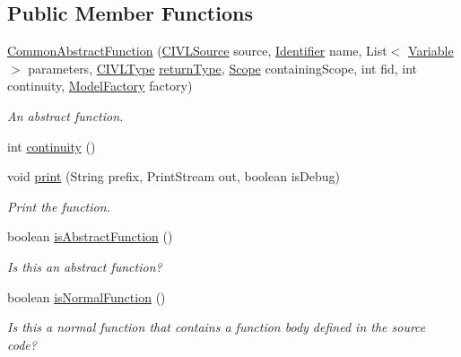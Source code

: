 \subsection*{Public Member Functions}
\begin{DoxyCompactItemize}
\item 
\hyperlink{classedu_1_1udel_1_1cis_1_1vsl_1_1civl_1_1model_1_1common_1_1CommonAbstractFunction_a3bab5782bce73b29c6c4b5688684b956}{Common\+Abstract\+Function} (\hyperlink{interfaceedu_1_1udel_1_1cis_1_1vsl_1_1civl_1_1model_1_1IF_1_1CIVLSource}{C\+I\+V\+L\+Source} source, \hyperlink{interfaceedu_1_1udel_1_1cis_1_1vsl_1_1civl_1_1model_1_1IF_1_1Identifier}{Identifier} name, List$<$ \hyperlink{interfaceedu_1_1udel_1_1cis_1_1vsl_1_1civl_1_1model_1_1IF_1_1variable_1_1Variable}{Variable} $>$ parameters, \hyperlink{interfaceedu_1_1udel_1_1cis_1_1vsl_1_1civl_1_1model_1_1IF_1_1type_1_1CIVLType}{C\+I\+V\+L\+Type} \hyperlink{classedu_1_1udel_1_1cis_1_1vsl_1_1civl_1_1model_1_1common_1_1CommonFunction_a10255f23596c5974e8474769f03a4848}{return\+Type}, \hyperlink{interfaceedu_1_1udel_1_1cis_1_1vsl_1_1civl_1_1model_1_1IF_1_1Scope}{Scope} containing\+Scope, int fid, int continuity, \hyperlink{interfaceedu_1_1udel_1_1cis_1_1vsl_1_1civl_1_1model_1_1IF_1_1ModelFactory}{Model\+Factory} factory)
\begin{DoxyCompactList}\small\item\em An abstract function. \end{DoxyCompactList}\item 
int \hyperlink{classedu_1_1udel_1_1cis_1_1vsl_1_1civl_1_1model_1_1common_1_1CommonAbstractFunction_aaff3d656eaaa893bac55bea0ec3c7e53}{continuity} ()
\item 
void \hyperlink{classedu_1_1udel_1_1cis_1_1vsl_1_1civl_1_1model_1_1common_1_1CommonAbstractFunction_afbf8fc161f5a1ad311a57cb13fbde657}{print} (String prefix, Print\+Stream out, boolean is\+Debug)
\begin{DoxyCompactList}\small\item\em Print the function. \end{DoxyCompactList}\item 
boolean \hyperlink{classedu_1_1udel_1_1cis_1_1vsl_1_1civl_1_1model_1_1common_1_1CommonAbstractFunction_ae10861c37197dea824fe76c0bad57290}{is\+Abstract\+Function} ()
\begin{DoxyCompactList}\small\item\em Is this an abstract function? \end{DoxyCompactList}\item 
boolean \hyperlink{classedu_1_1udel_1_1cis_1_1vsl_1_1civl_1_1model_1_1common_1_1CommonAbstractFunction_a26fbd6eb0284ba3eb5d432619500b3da}{is\+Normal\+Function} ()
\begin{DoxyCompactList}\small\item\em Is this a normal function that contains a function body defined in the source code? \end{DoxyCompactList}\end{DoxyCompactItemize}
